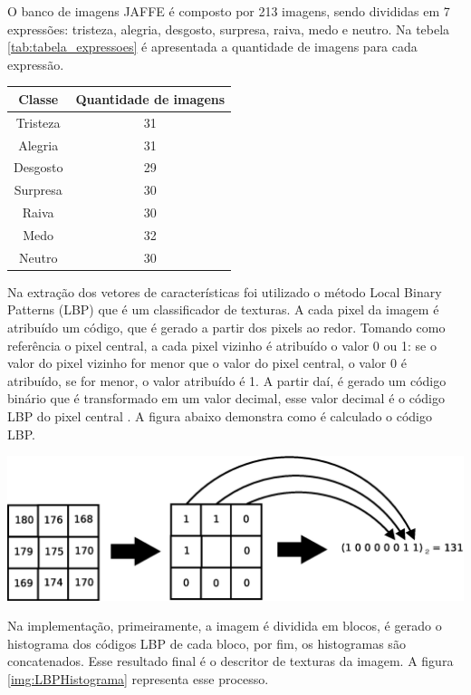 \begin{itemize}
O banco de imagens JAFFE é composto por 213 imagens, sendo divididas em 7 expressões: tristeza, alegria, desgosto, surpresa, raiva, medo e neutro. Na tebela \ref{tab:tabela_expressoes} é apresentada a quantidade de imagens para cada expressão.

\begin{center}
	\begin{tabular}{cc}
        \hline
        Classe & Quantidade de imagens \\
        \hline
		Tristeza & 31 \\
		Alegria & 31 \\
		Desgosto & 29 \\
		Surpresa & 30 \\
		Raiva & 30 \\
		Medo & 32 \\
		Neutro & 30 \\
        \hline
	\end{tabular}
	\label{tab:tabela_expressoes}
\end{center}

Na extração dos vetores de características foi utilizado o método Local Binary Patterns (LBP) que é um classificador de texturas. A cada pixel da imagem é atribuído um código, que é gerado a partir dos pixels ao redor. Tomando como referência o pixel central, a cada pixel vizinho é atribuído o valor 0 ou 1: se o valor do pixel vizinho for menor que o valor do pixel central, o valor 0 é atribuído, se for menor, o valor atribuído é 1. A partir daí, é gerado um código binário que é transformado em um valor decimal, esse valor decimal é o código LBP do pixel central \cite{LBPShan2009}. A figura abaixo demonstra como é calculado o código LBP.

\begin{center}
	\includegraphics[scale=0.5]{graficos/LBP}
	\label{img:LBP}
\end{center}

Na implementação, primeiramente, a imagem é dividida em blocos, é gerado o histograma dos códigos LBP de cada bloco, por fim, os histogramas são concatenados. Esse resultado final é o descritor de texturas da imagem. A figura \ref{img:LBPHistograma} representa esse processo.


\end{itemize}
